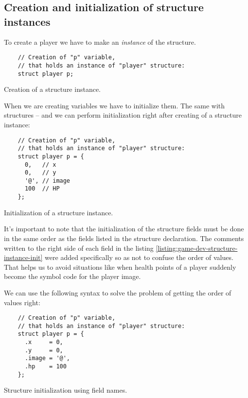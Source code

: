 \documentclass[../sparc.tex]{subfiles}
\begin{document}
\subsection{Creation and initialization of structure instances}

To create a player we have to make an \emph{instance} of the structure.

\begin{listing}[H]
  \begin{verbatim}
    // Creation of "p" variable,
    // that holds an instance of "player" structure:
    struct player p;
  \end{verbatim}
  \caption{Creation of a structure instance.}
  \label{listing:game-dev-structure-instance}
\end{listing}

When we are creating variables we have to initialize them.  The same with
structures -- and we can perform initialization right after creating of a
structure instance:

\begin{listing}[H]
  \begin{verbatim}
    // Creation of "p" variable,
    // that holds an instance of "player" structure:
    struct player p = {
      0,   // x
      0,   // y
      '@', // image
      100  // HP
    };
  \end{verbatim}
  \caption{Initialization of a structure instance.}
  \label{listing:game-dev-structure-instance-init}
\end{listing}

It's important to note that the initialization of the structure fields must be
done in the same order as the fields listed in the structure declaration.  The
comments written to the right side of each field in the listing
\ref{listing:game-dev-structure-instance-init} were added specifically so as not
to confuse the order of values.  That helps us to avoid situations like when
health points of a player suddenly become the symbol code for the player image.

We can use the following syntax to solve the problem of getting the order of
values right:

\begin{listing}[H]
  \begin{verbatim}
    // Creation of "p" variable,
    // that holds an instance of "player" structure:
    struct player p = {
      .x     = 0,
      .y     = 0,
      .image = '@',
      .hp    = 100
    };
  \end{verbatim}
  \caption{Structure initialization using field names.}
  \label{listing:game-dev-structure-instance-init-names}
\end{listing}
\end{document}
